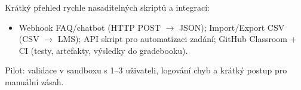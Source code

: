 Krátký přehled rychle nasaditelných skriptů a integrací:
\begin{itemize}
\item Webhook FAQ/chatbot (HTTP POST $\rightarrow$ JSON); Import/Export CSV (CSV $\rightarrow$ LMS); API skript pro automatizaci zadání; GitHub Classroom + CI (testy, artefakty, výsledky do gradebooku).
\end{itemize}
Pilot: validace v sandboxu s 1–3 uživateli, logování chyb a krátký postup pro manuální zásah.